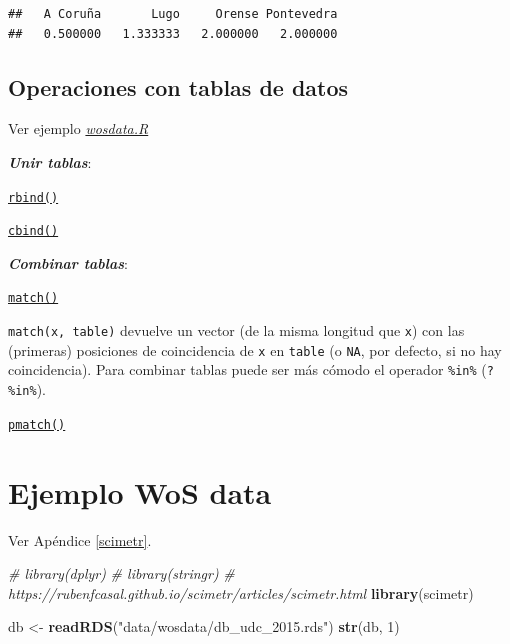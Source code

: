 \documentclass[]{book}
\newenvironment{Shaded}{\begin{snugshade}}{\end{snugshade}}
\newcommand{\KeywordTok}[1]{\textcolor[rgb]{0.13,0.29,0.53}{\textbf{#1}}}
\newcommand{\DecValTok}[1]{\textcolor[rgb]{0.00,0.00,0.81}{#1}}
\newcommand{\StringTok}[1]{\textcolor[rgb]{0.31,0.60,0.02}{#1}}
\newcommand{\CommentTok}[1]{\textcolor[rgb]{0.56,0.35,0.01}{\textit{#1}}}
\newcommand{\NormalTok}[1]{#1}
\begin{document}
\begin{verbatim}
##   A Coruña       Lugo     Orense Pontevedra 
##   0.500000   1.333333   2.000000   2.000000
\end{verbatim}

\subsection{Operaciones con tablas de
datos}\label{operaciones-con-tablas-de-datos}

Ver ejemplo \href{data/wosdata.zip}{\emph{wosdata.R}}

\textbf{\emph{Unir tablas}}:

\href{https://www.rdocumentation.org/packages/base/versions/3.6.1/topics/rbind}{\texttt{rbind()}}

\href{https://www.rdocumentation.org/packages/base/versions/3.6.1/topics/cbind}{\texttt{cbind()}}

\textbf{\emph{Combinar tablas}}:

\href{https://www.rdocumentation.org/packages/base/versions/3.6.1/topics/match}{\texttt{match()}}

\texttt{match(x,\ table)} devuelve un vector (de la misma longitud que
\texttt{x}) con las (primeras) posiciones de coincidencia de \texttt{x}
en \texttt{table} (o \texttt{NA}, por defecto, si no hay coincidencia).
Para combinar tablas puede ser más cómodo el operador \texttt{\%in\%}
(\texttt{?\textquotesingle{}\%in\%\textquotesingle{}}).

\href{https://www.rdocumentation.org/packages/base/versions/3.6.1/topics/match}{\texttt{pmatch()}}

\section{Ejemplo WoS data}\label{ejemplo-wos-data}

Ver Apéndice \ref{scimetr}.

\begin{Shaded}
\begin{Highlighting}[]
\CommentTok{# library(dplyr)}
\CommentTok{# library(stringr)}
\CommentTok{# https://rubenfcasal.github.io/scimetr/articles/scimetr.html}
\KeywordTok{library}\NormalTok{(scimetr)}

\NormalTok{db <-}\StringTok{ }\KeywordTok{readRDS}\NormalTok{(}\StringTok{"data/wosdata/db_udc_2015.rds"}\NormalTok{)}
\KeywordTok{str}\NormalTok{(db, }\DecValTok{1}\NormalTok{)}
\end{Highlighting}
\end{Shaded}
\end{document}
